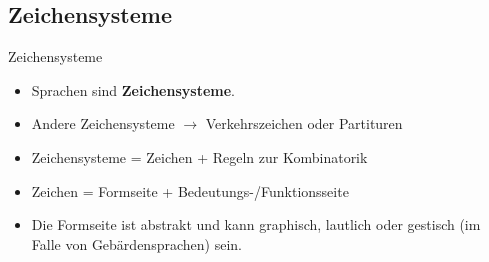 %
\subsection{Zeichensysteme}
	
\begin{frame}{Zeichensysteme}
			
\begin{itemize}
	\item<1-> Sprachen sind \textbf{Zeichensysteme}.
	\item<1-> Andere Zeichensysteme $\rightarrow$ Verkehrszeichen oder Partituren
	\item<2-> Zeichensysteme = Zeichen + Regeln zur Kombinatorik
	\item<3-> Zeichen = Formseite + Bedeutungs-/Funktionsseite
	\item<3-> Die Formseite ist abstrakt und kann graphisch, lautlich oder gestisch (im Falle von Gebärdensprachen) sein.
\end{itemize}			
			
				

\end{frame}			



